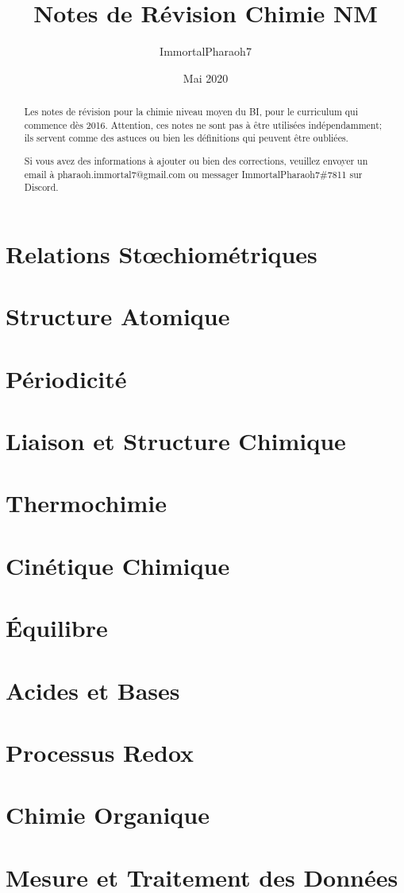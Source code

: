 \documentclass[french, a4paper, 12pt]{article}
\author{ImmortalPharaoh7}
\title{Notes de Révision Chimie NM}
\date{Mai 2020}
\begin{document}
\begin{titlepage}
\maketitle
\begin{abstract}
Les notes de révision pour la chimie niveau moyen du BI, pour le curriculum qui commence dès 2016. Attention, ces notes ne sont pas à être utilisées indépendamment; ils servent comme des astuces ou bien les définitions qui peuvent être oubliées.

Si vous avez des informations à ajouter ou bien des corrections, veuillez envoyer un email à pharaoh.immortal7@gmail.com ou messager ImmortalPharaoh7\#7811 sur Discord.
\end{abstract}
\end{titlepage}

\tableofcontents
\pagebreak


\section{Relations Stœchiométriques}
\pagebreak

\section{Structure Atomique}
\pagebreak

\section{Périodicité}
\pagebreak

\section{Liaison et Structure Chimique}
\pagebreak

\section{Thermochimie}
\pagebreak

\section{Cinétique Chimique}
\pagebreak

\section{Équilibre}
\pagebreak

\section{Acides et Bases}
\pagebreak

\section{Processus Redox}
\pagebreak

\section{Chimie Organique}
\pagebreak

\section{Mesure et Traitement des Données}
\pagebreak
\end{document}
